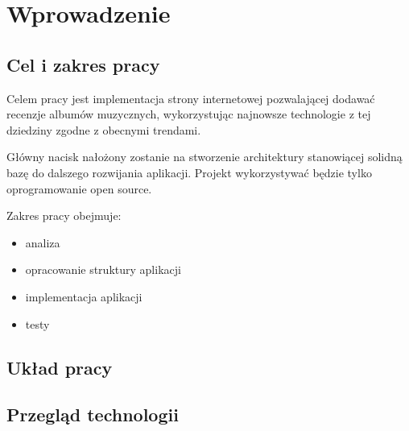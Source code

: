 \chapter{Wprowadzenie}
\section{Cel i zakres pracy}
	Celem pracy jest implementacja strony internetowej pozwalającej dodawać recenzje albumów muzycznych,
	wykorzystując najnowsze technologie z tej dziedziny zgodne z obecnymi trendami.

	Główny nacisk nałożony zostanie na stworzenie architektury stanowiącej solidną bazę do dalszego rozwijania aplikacji.
	Projekt wykorzystywać będzie tylko oprogramowanie open source.

	Zakres pracy obejmuje:
	\begin{itemize}
		\item analiza 
		\item opracowanie struktury aplikacji
		\item implementacja aplikacji
		\item testy 
	\end{itemize}
	
\section{Układ pracy}

\section{Przegląd technologii}

